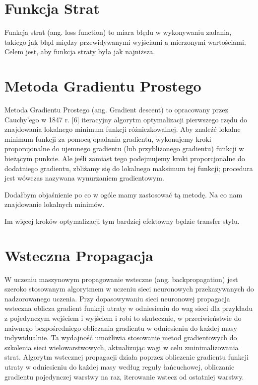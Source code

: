 \documentclass[brudnopis]{xmgr}
\begin{document}
 \section{Funkcja Strat \label{s:dsssl}}
Funkcja strat (ang. loss function) to miara błędu w wykonywaniu zadania, takiego jak błąd między przewidywanymi wyjściami a mierzonymi wartościami. Celem jest, aby funkcja straty była jak najniższa.
 
 \section{Metoda Gradientu Prostego\label{s:dsssl}}

Metoda Gradientu Prostego (ang. Gradient descent) to opracowany przez Cauchy'ego w 1847 r. [6] iteracyjny algorytm optymalizacji pierwszego rzędu do znajdowania lokalnego minimum funkcji różniczkowalnej. Aby znaleźć lokalne minimum funkcji za pomocą opadania gradientu, wykonujemy kroki proporcjonalne do ujemnego gradientu (lub przybliżonego gradientu) funkcji w bieżącym punkcie. Ale jeśli zamiast tego podejmujemy kroki proporcjonalne do dodatniego gradientu, zbliżamy się do lokalnego maksimum tej funkcji; procedura jest wówczas nazywana wynurzaniem gradientowym. 

Dodałbym objaśnienie po co w ogóle mamy zastosować tą metodę. Na co nam znajdowanie lokalnych minimów.



Im więcej kroków optymalizacji tym bardziej efektowny będzie transfer stylu.


\section{Wsteczna Propagacja\label{s:dsssl}}

W uczeniu maszynowym propagowanie wsteczne (ang. backpropagation) jest szeroko stosowanym algorytmem w uczeniu sieci neuronowych przekazywanych do nadzorowanego uczenia. Przy dopasowywaniu sieci neuronowej propagacja wsteczna oblicza gradient funkcji utraty w odniesieniu do wag sieci dla przykładu z pojedynczym wejściem i wyjściem i robi to skutecznie, w przeciwieństwie do naiwnego bezpośredniego obliczania gradientu w odniesieniu do każdej masy indywidualnie. Ta wydajność umożliwia stosowanie metod gradientowych do szkolenia sieci wielowarstwowych, aktualizując wagi w celu zminimalizowania strat. Algorytm wstecznej propagacji działa poprzez obliczenie gradientu funkcji utraty w odniesieniu do każdej masy według reguły łańcuchowej, obliczanie gradientu pojedynczej warstwy na raz, iterowanie wstecz od ostatniej warstwy.
\end{document}
